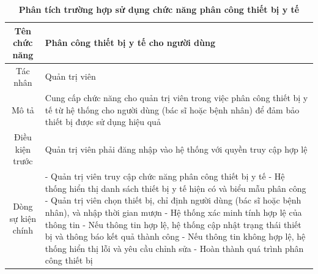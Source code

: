 \begin{table}[H]
	\caption{\bfseries \fontsize{12pt}{0pt}\selectfont Phân tích trường hợp sử dụng chức năng phân công thiết bị y tế}
	\centering
	\begin{tabularx}{0.9\textwidth}{|c|X|}
		\hline
		\textbf{Tên chức năng} & \textbf{Phân công thiết bị y tế cho người dùng}                                                                                                                      \\
		\hline
		Tác nhân               & Quản trị viên                                                                                                                                                        \\
		\hline
		Mô tả                  & Cung cấp chức năng cho quản trị viên trong việc phân công thiết bị y tế từ hệ thống cho người dùng (bác sĩ hoặc bệnh nhân) để đảm bảo thiết bị được sử dụng hiệu quả \\
		\hline
		Điều kiện trước        & Quản trị viên phải đăng nhập vào hệ thống với quyền truy cập hợp lệ                                                                                                  \\
		\hline
		Dòng sự kiện chính     &
		- Quản trị viên truy cập chức năng phân công thiết bị y tế \newline
		- Hệ thống hiển thị danh sách thiết bị y tế hiện có và biểu mẫu phân công \newline
		- Quản trị viên chọn thiết bị, chỉ định người dùng (bác sĩ hoặc bệnh nhân), và nhập thời gian mượn \newline
		- Hệ thống xác minh tính hợp lệ của thông tin \newline
		- Nếu thông tin hợp lệ, hệ thống cập nhật trạng thái thiết bị và thông báo kết quả thành công \newline
		- Nếu thông tin không hợp lệ, hệ thống hiển thị lỗi và yêu cầu chỉnh sửa \newline
		- Hoàn thành quá trình phân công thiết bị                                                                                                                                                     \\
		\hline
	\end{tabularx}
\end{table}


